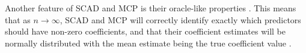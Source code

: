 \documentclass{article}
\begin{document}

	Another feature of SCAD and MCP is their oracle-like properties \cite{fan2001variable, zhang2010nearly}. This means that as $n\to\infty$, SCAD and MCP will correctly identify exactly which predictors should have non-zero coefficients, and that their coefficient estimates will be normally distributed with the mean estimate being the true coefficient value \cite{zou2006adaptive}.
	
\end{document}
